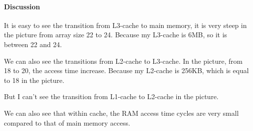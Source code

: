 \paragraph{Discussion}
It is easy to see the transition from L3-cache to main memory, it is very steep in the picture from array size 22 to 24. Because my L3-cache is 6MB, so it is between 22 and 24.

We can also see the transitions from L2-cache to L3-cache. In the picture, from 18 to 20, the access time increase. Because my L2-cache is 256KB, which is equal to 18 in the picture.

But I can't see the transition from L1-cache to L2-cache in the picture.

We can also see that within cache, the RAM access time cycles are very small compared to that of main memory access.